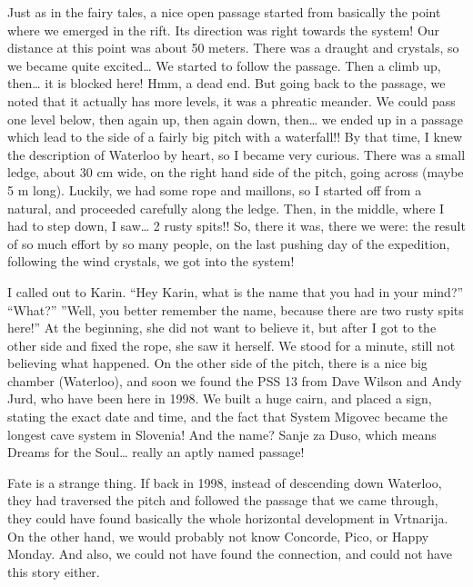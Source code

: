 Just as in the fairy tales, a nice open passage started from basically
the point where we emerged in the rift. Its direction was right towards
the system! Our distance at this point was about 50 meters. There was a
draught and crystals, so we became quite excited\ldots{} We started to
follow the passage. Then a climb up, then\ldots{} it is blocked here!
Hmm, a dead end. But going back to the passage, we noted that it
actually has more levels, it was a phreatic meander. We could pass one
level below, then again up, then again down, then\ldots{} we ended up in
a passage which lead to the side of a fairly big pitch with a
waterfall!! By that time, I knew the description of Waterloo by heart,
so I became very curious. There was a small ledge, about 30 cm wide, on
the right hand side of the pitch, going across (maybe 5 m long).
Luckily, we had some rope and maillons, so I started off from a natural,
and proceeded carefully along the ledge. Then, in the middle, where I
had to step down, I saw\ldots{} 2 rusty spits!! So, there it was, there
we were: the result of so much effort by so many people, on the last
pushing day of the expedition, following the wind crystals, we got into
the system!

I called out to Karin. ``Hey Karin, what is the name that you had in
your mind?'' ``What?'' ''Well, you better remember the name, because
there are two rusty spits here!'' At the beginning, she did not want to
believe it, but after I got to the other side and fixed the rope, she
saw it herself. We stood for a minute, still not believing what
happened. On the other side of the pitch, there is a nice big chamber
(Waterloo), and soon we found the PSS 13 from Dave Wilson and Andy Jurd,
who have been here in 1998. We built a huge cairn, and placed a sign,
stating the exact date and time, and the fact that System Migovec became
the longest cave system in Slovenia! And the name? Sanje za Duso, which
means Dreams for the Soul\ldots{} really an aptly named passage!

Fate is a strange thing. If back in 1998, instead of descending down
Waterloo, they had traversed the pitch and followed the passage that we
came through, they could have found basically the whole horizontal
development in Vrtnarija. On the other hand, we would probably not know
Concorde, Pico, or Happy Monday. And also, we could not have found the
connection, and could not have this story either.

